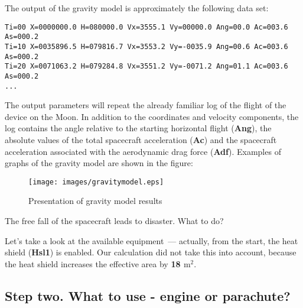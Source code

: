 \documentclass[12pt,a4paper]{article}
\begin{document}
\hfill

\noindent{}

\hfill

The output of the gravity model is approximately the following data set:

\begin{verbatim}
Ti=00 X=0000000.0 H=080000.0 Vx=3555.1 Vy=00000.0 Ang=00.0 Ac=003.6 As=000.2
Ti=10 X=0035896.5 H=079816.7 Vx=3553.2 Vy=-0035.9 Ang=00.6 Ac=003.6 As=000.2
Ti=20 X=0071063.2 H=079284.8 Vx=3551.2 Vy=-0071.2 Ang=01.1 Ac=003.6 As=000.2
...
\end{verbatim}

The output parameters will repeat the already familiar log of the flight of the device on the Moon. In addition to the coordinates and velocity components, the log contains the angle relative to the starting horizontal flight (\textbf{Ang}), the absolute values of the total spacecraft acceleration (\textbf{Ac}) and the spacecraft acceleration associated with the aerodynamic drag force (\textbf{Adf}). Examples of graphs of the gravity model are shown in the figure:

\begin{figure}[tbh]
  \begin{center}
    \texttt{[image: images/gravitymodel.eps]}
    \caption{Presentation of gravity model results}
    \label{Pic:gravitymodel}
  \end{center}
\end{figure}

The free fall of the spacecraft leads to disaster. What to do?

Let's take a look at the available equipment~--- actually, from the start, the heat shield (\textbf{Hsl1}) is enabled. Our calculation did not take this into account, because the heat shield increases the effective area by \textbf{18 $\text{m}^2$}.

\hfill

\noindent{}

\subsection{Step two. What to use - engine or parachute?}
\end{document}
